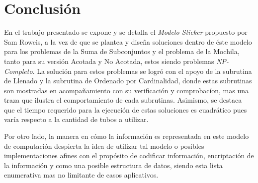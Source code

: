 \documentclass[12pt, letterpaper, twoside]{article}
\begin{document}
    \section{Conclusión}
    En el trabajo presentado se expone y se detalla el \emph{Modelo Sticker}\autocite{sticker_model} propuesto por Sam Roweis, a la vez de que se plantea y diseña soluciones dentro de éste modelo para los problemas de la Suma de Subconjuntos y el problema de la Mochila, tanto para su versión Acotada y No Acotada, estos siendo problemas \emph{NP-Completo}. La solución para estos problemas se logró con el apoyo de la subrutina de Llenado y la subrutina de Ordenado por Cardinalidad, donde estas subrutinas son mostradas en acompañamiento con su verificación y comprobacíon, mas una traza que ilustra el comportamiento de cada subrutinas. Asimismo, se destaca que el tiempo requerido para la ejecución de estas soluciones es cuadrático pues varía respecto a la cantidad de tubos a utilizar. 


    Por otro lado, la manera en cómo la información es representada en este modelo de computación despierta la idea de utilizar tal modelo o posibles implementaciones afines con el propósito de codificar información, encriptación de la información y como una posible estructura de datos, siendo esta lista enumerativa mas no limitante de casos aplicativos.

    \newpage
    \printbibliography[title={Bibliografía}]
\end{document}
